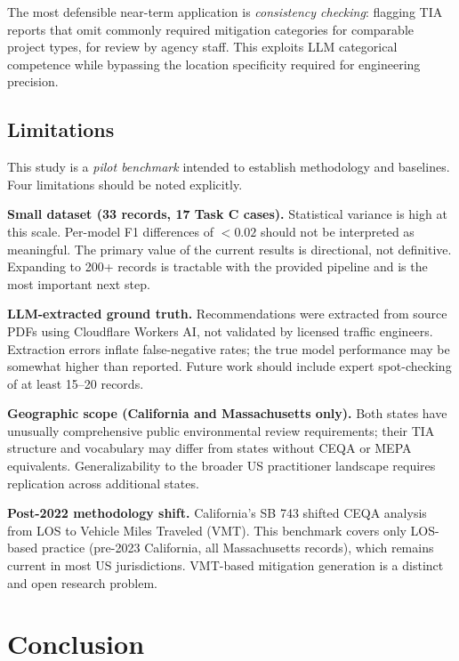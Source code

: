 \documentclass[preprint,12pt]{elsarticle}
\begin{document}
The most defensible near-term application is \emph{consistency checking}:
flagging TIA reports that omit commonly required mitigation categories for
comparable project types, for review by agency staff.
This exploits LLM categorical competence while bypassing the location
specificity required for engineering precision.

\subsection{Limitations}

This study is a \emph{pilot benchmark} intended to establish methodology and
baselines. Four limitations should be noted explicitly.

\textbf{Small dataset (33 records, 17 Task C cases).}
Statistical variance is high at this scale.
Per-model F1 differences of $<0.02$ should not be interpreted as meaningful.
The primary value of the current results is directional, not definitive.
Expanding to 200+ records is tractable with the provided pipeline and is
the most important next step.

\textbf{LLM-extracted ground truth.}
Recommendations were extracted from source PDFs using Cloudflare Workers AI,
not validated by licensed traffic engineers.
Extraction errors inflate false-negative rates; the true model performance
may be somewhat higher than reported.
Future work should include expert spot-checking of at least 15--20 records.

\textbf{Geographic scope (California and Massachusetts only).}
Both states have unusually comprehensive public environmental review
requirements; their TIA structure and vocabulary may differ from states
without CEQA or MEPA equivalents.
Generalizability to the broader US practitioner landscape requires replication
across additional states.

\textbf{Post-2022 methodology shift.}
California's SB 743 shifted CEQA analysis from LOS to Vehicle Miles Traveled
(VMT). This benchmark covers only LOS-based practice (pre-2023 California,
all Massachusetts records), which remains current in most US jurisdictions.
VMT-based mitigation generation is a distinct and open research problem.

\section{Conclusion}
\label{sec:conclusion}
\end{document}
